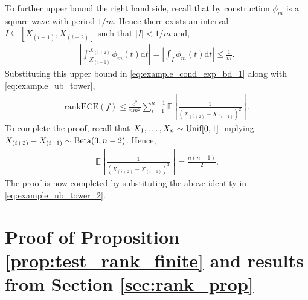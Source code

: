 \documentclass[11pt]{article}
\numberwithin{equation}{section}
\theoremstyle{definition}
\newcommand{\E}{\mathbb{E}}
\newcommand{\rankECE}{\mathrm{rankECE}}
\newcommand{\rmd}{\mathrm{d}}
\begin{document}
To further upper bound the right hand side, recall that by construction $\phi_m$ is a square wave with period $1/m$. Hence there exists an interval $I\subseteq [X_{(i-1)}, X_{(i+2)}]$ such that $|I|<1/m$ and,
\begin{align*}
    \left|\int_{X_{(i-1)}}^{X_{(i+2)}}\phi_m(t)\rmd t\right| = \left|\int_{I}\phi_m(t)\rmd t\right|\leq \frac{1}{m}.
\end{align*}
Substituting this upper bound in \eqref{eq:example_cond_exp_bd_1} along with \eqref{eq:example_ub_tower},
\begin{align}\label{eq:example_ub_tower_2}
    \rankECE(f)\leq \frac{c^2}{nm^2}\sum_{i=1}^{n-1}\E\left[\frac{1}{(X_{(i+2)} - X_{(i-1)})^2}\right].
\end{align}
To complete the proof, recall that $X_1,\ldots, X_n\sim\textnormal{Unif}[0,1]$ implying $X_{(i+2)} - X_{(i-1)}\sim \textnormal{Beta}(3, n-2)$. Hence,
\begin{align*}
    \E\left[\frac{1}{(X_{(i+2)} - X_{(i-1)})^2}\right] = \frac{n(n-1)}{2}.
\end{align*}
The proof is now completed by substituting the above identity in \eqref{eq:example_ub_tower_2}.


\section{Proof of Proposition \ref{prop:test_rank_finite} and results from Section \ref{sec:rank_prop}}
\end{document}
